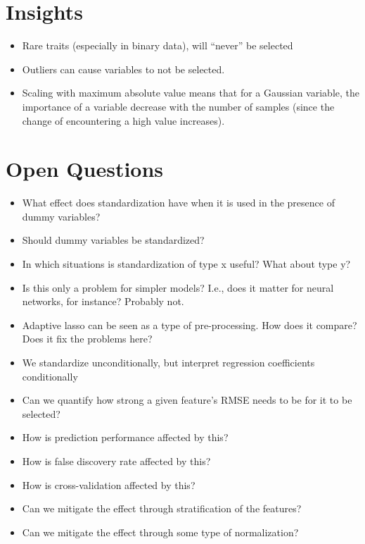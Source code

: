 \section{Insights}

\begin{itemize}
  \item Rare traits (especially in binary data), will ``never'' be selected
  \item Outliers can cause variables to not be selected.
  \item Scaling with maximum absolute value means that for a Gaussian variable, the importance of a variable decrease with the number of samples (since the change of encountering a high value increases).
\end{itemize}

\section{Open Questions}

\begin{itemize}
  \item What effect does standardization have when it is used in the presence of dummy variables?
  \item Should dummy variables be standardized?
  \item In which situations is standardization of type x useful? What about type y?
  \item Is this only a problem for simpler models? I.e., does it matter for neural networks, for instance? Probably not.
  \item Adaptive lasso can be seen as a type of pre-processing. How does it compare? Does it fix the problems here?
  \item We standardize unconditionally, but interpret regression coefficients conditionally
  \item Can we quantify how strong a given feature's RMSE needs to be for it to be selected?
  \item How is prediction performance affected by this?
  \item How is false discovery rate affected by this?
  \item How is cross-validation affected by this?
  \item Can we mitigate the effect through stratification of the features?
  \item Can we mitigate the effect through some type of normalization?
\end{itemize}



